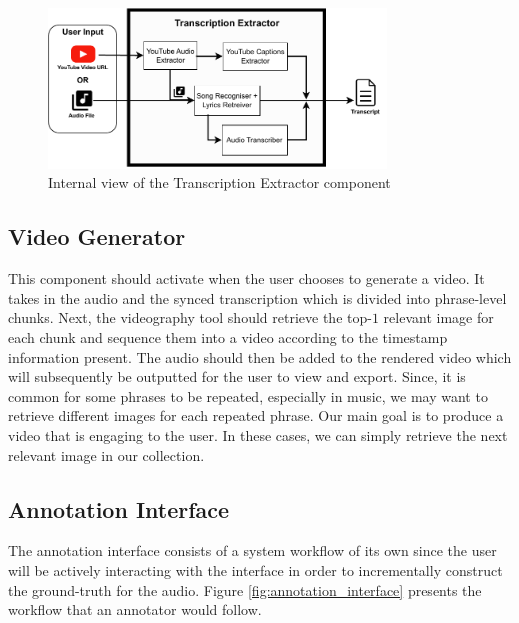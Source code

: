 \documentclass{l4proj}
\begin{document}
\begin{figure}
    \centering
    \includegraphics[width=0.8\textwidth]{figures/transcription_extractor.pdf}
    \caption{Internal view of the Transcription Extractor component}
    \label{fig:transcription_extractor}
\end{figure}

\subsection{Video Generator}
This component should activate when the user chooses to generate a video. It takes in the audio and the synced transcription which is divided into phrase-level chunks. Next, the videography tool should retrieve the top-$1$ relevant image for each chunk and sequence them into a video according to the timestamp information present. The audio should then be added to the rendered video which will subsequently be outputted for the user to view and export. Since, it is common for some phrases to be repeated, especially in music, we may want to retrieve different images for each repeated phrase. Our main goal is to produce a video that is engaging to the user. In these cases, we can simply retrieve the next relevant image in our collection.

\subsection{Annotation Interface}
The annotation interface consists of a system workflow of its own since the user will be actively interacting with the interface in order to incrementally construct the ground-truth for the audio. Figure \ref{fig:annotation_interface} presents the workflow that an annotator would follow.
\end{document}

